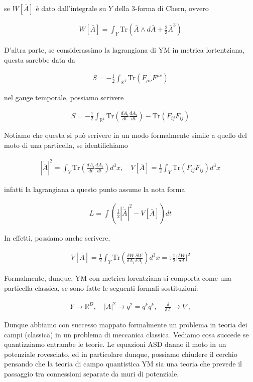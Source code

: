 \documentclass{report}
\begin{document}
se \(W[\bar{A}]\) è dato dall'integrale su \(Y\) della 3-forma di Chern, ovvero 

\begin{align}
    W[\bar{A}] = \int_{Y} \text{Tr}(\bar{A}\wedge d\bar{A} + \frac{2}{3}\bar{A}^3)
\end{align}

D'altra parte, se considerassimo la lagrangiana di YM in metrica lortentziana, questa sarebbe data da

\begin{align}
    S = -\frac{1}{2}\int_{\mathbb{R}^4}\text{Tr}(F_{\mu\nu}F^{\mu\nu})
\end{align}

nel gauge temporale, possiamo scrivere 

\begin{align}
    S = -\frac{1}{2}\int_{\mathbb{R}^4}\text{Tr}\left(\frac{dA_i}{dt}\frac{dA_i}{dt} \right) - \text{Tr}\left(F_{ij}F_{ij} \right)
\end{align}

Notiamo che questa si può scrivere in un modo formalmente simile a quello del moto di una particella, se identifichiamo 

\begin{align}
    |\dot{\bar{A}}|^2 = \int_{Y}\text{Tr} \left(\frac{dA_i}{dt}\frac{dA_i}{dt} \right) d^3x, \quad V[\bar{A}] = \frac{1}{2}\int_{Y}\text{Tr}(F_{ij}F_{ij})d^3x
\end{align}

infatti la lagrangiana a questo punto assume la nota forma 

\begin{align}
    L = \int \left(\frac{1}{2}|\dot{\bar{A}}|^2 - V[\bar{A}] \right)dt
\end{align}

In effetti, possiamo anche scrivere, 

\begin{align}
    V[\bar{A}] = \frac{1}{2}\int_Y \text{Tr}\left(\frac{\delta W}{\delta A_i}\frac{\delta W}{\delta A_i}\right) d^3x =: \frac{1}{2}\biggr|\frac{\delta W}{\delta A} \biggr|^2
\end{align}

Formalmente, dunque, YM con metrica lorentziana si comporta come una particella classica, se sono fatte le seguenti formali sostituzioni: 

\begin{align}
    Y \rightarrow \mathbb{R}^D, \quad |A|^2 \rightarrow q^2 = q^k q^k, \quad\frac{\delta}{\delta A} \rightarrow \nabla, 
\end{align}

Dunque abbiamo con successo mappato formalmente un problema in teoria dei campi (classica) in un problema di meccanica classica. Vediamo cosa succede se quantizziamo entrambe le teorie. Le equazioni ASD danno il moto in un potenziale rovesciato, ed in particolare dunque, possiamo chiudere il cerchio pensando che la teoria di campo quantistica YM sia una teoria che prevede il passaggio tra connessioni separate da muri di potenziale. 
\end{document}
